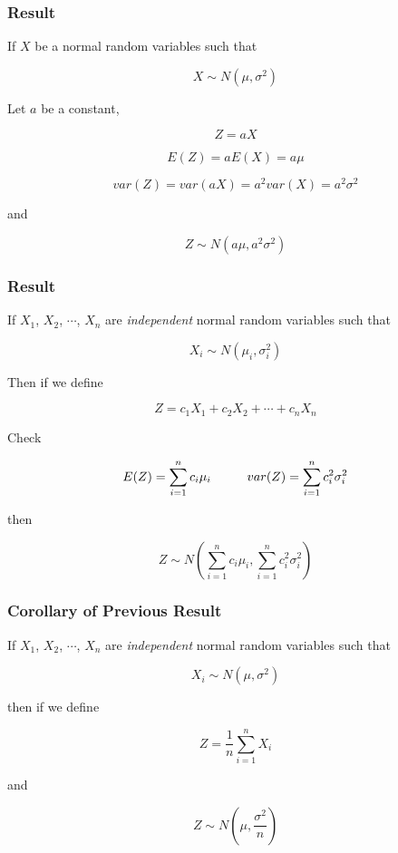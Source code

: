 \documentclass{beamer}\usepackage[]{graphicx}\usepackage[]{color}
\begin{document}
\begin{frame}[fragile]

\frametitle{Result}

If $X$ be a  normal random variables such that 

$$ X \sim N \left (\mu, \sigma^2 \right) $$

Let $a$ be a constant,

$$ Z = aX $$

$$ E(Z) = aE(X) = a\mu $$

$$ var(Z)= var(aX) = a^2 var(X) = a^2 \sigma^2 $$

and 

$$  Z \sim N \left (a\mu, a^2\sigma^2 \right ) $$

\end{frame}

\begin{frame}[fragile]

\frametitle{Result}

If $X_1$, $X_2$, $\cdots$, $X_n$ are \emph{independent} normal random variables such that 

$$ X_{i} \sim N \left (\mu_i, \sigma^2_{i} \right) $$

Then if we define 

$$ Z = c_1 X_1 + c_2 X_2 + \cdots + c_n X_{n} $$

Check 

$$ E(Z) = \sum_{i=1}^{n} c_{i} \mu_{i} \hspace{1 cm} var(Z)=\sum_{i=1}^{n} c^2_{i} \sigma^2_{i} $$

then 

$$  Z \sim N \left (\sum_{i=1}^{n} c_{i} \mu_{i}, \sum_{i=1}^{n} c^2_{i} \sigma^2_{i} \right) $$

\end{frame}

\begin{frame}[fragile]

\frametitle{Corollary of Previous Result}

If $X_1$, $X_2$, $\cdots$, $X_n$ are \emph{independent} normal random variables such that 

$$ X_{i} \sim N \left (\mu, \sigma^2 \right) $$

then if we define 

$$ Z = \frac{1}{n} \sum_{i=1}^{n} X_{i} $$

and 

$$  Z \sim N \left (\mu, \frac{\sigma^2}{n} \right) $$

\end{frame}
\end{document}
